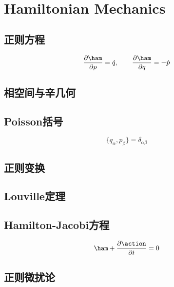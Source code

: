 
\chapter{Hamiltonian Mechanics}

\section{正则方程}
\label{sec:cannoical_eqs}
\begin{equation}
    \frac{\partial\ham}{\partial p} = \dot{q},\qquad\frac{\partial \ham}{\partial q} = -\dot{p}
\end{equation}
\section{相空间与辛几何}
\section{Poisson括号}
\label{sec:poisson_brak}
\begin{equation}
    \{ q_\alpha, p_\beta\} = \delta_{\alpha\beta}
\end{equation}
\section{正则变换}
\label{sec:cannoical_transf}
\section{Louville定理}
\section{Hamilton-Jacobi方程}
\label{sec:Ham_Jacobi}

\begin{equation}
    \ham + \frac{\partial \action}{\partial t}=0
\end{equation}


\section{正则微扰论}
\label{sec:perturbation}